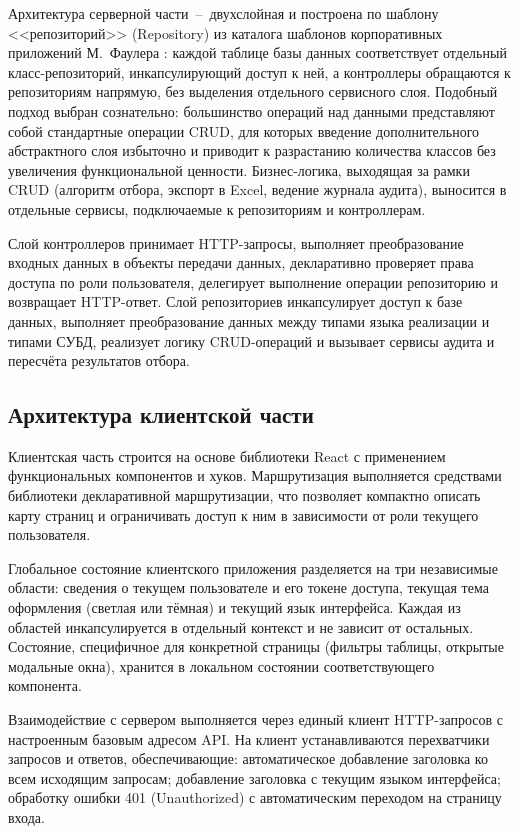 Архитектура серверной части~--~двухслойная и построена по шаблону <<репозиторий>> (Repository) из каталога шаблонов корпоративных приложений М.~Фаулера : каждой таблице базы данных соответствует отдельный класс-репозиторий, инкапсулирующий доступ к ней, а контроллеры обращаются к репозиториям напрямую, без выделения отдельного сервисного слоя.
Подобный подход выбран сознательно: большинство операций над данными представляют собой стандартные операции CRUD, для которых введение дополнительного абстрактного слоя избыточно и приводит к разрастанию количества классов без увеличения функциональной ценности.
Бизнес-логика, выходящая за рамки CRUD (алгоритм отбора, экспорт в Excel, ведение журнала аудита), выносится в отдельные сервисы, подключаемые к репозиториям и контроллерам.

Слой контроллеров принимает HTTP-запросы, выполняет преобразование входных данных в объекты передачи данных, декларативно проверяет права доступа по роли пользователя, делегирует выполнение операции репозиторию и возвращает HTTP-ответ.
Слой репозиториев инкапсулирует доступ к базе данных, выполняет преобразование данных между типами языка реализации и типами СУБД, реализует логику CRUD-операций и вызывает сервисы аудита и пересчёта результатов отбора.

\subsection{Архитектура клиентской части}

Клиентская часть строится на основе библиотеки React с применением функциональных компонентов и хуков.
Маршрутизация выполняется средствами библиотеки декларативной маршрутизации, что позволяет компактно описать карту страниц и ограничивать доступ к ним в зависимости от роли текущего пользователя.

Глобальное состояние клиентского приложения разделяется на три независимые области: сведения о текущем пользователе и его токене доступа, текущая тема оформления (светлая или тёмная) и текущий язык интерфейса.
Каждая из областей инкапсулируется в отдельный контекст и не зависит от остальных.
Состояние, специфичное для конкретной страницы (фильтры таблицы, открытые модальные окна), хранится в локальном состоянии соответствующего компонента.

Взаимодействие с сервером выполняется через единый клиент HTTP-запросов с настроенным базовым адресом API.
На клиент устанавливаются перехватчики запросов и ответов, обеспечивающие: автоматическое добавление заголовка  ко всем исходящим запросам; добавление заголовка  с текущим языком интерфейса; обработку ошибки 401 (Unauthorized) с автоматическим переходом на страницу входа.

